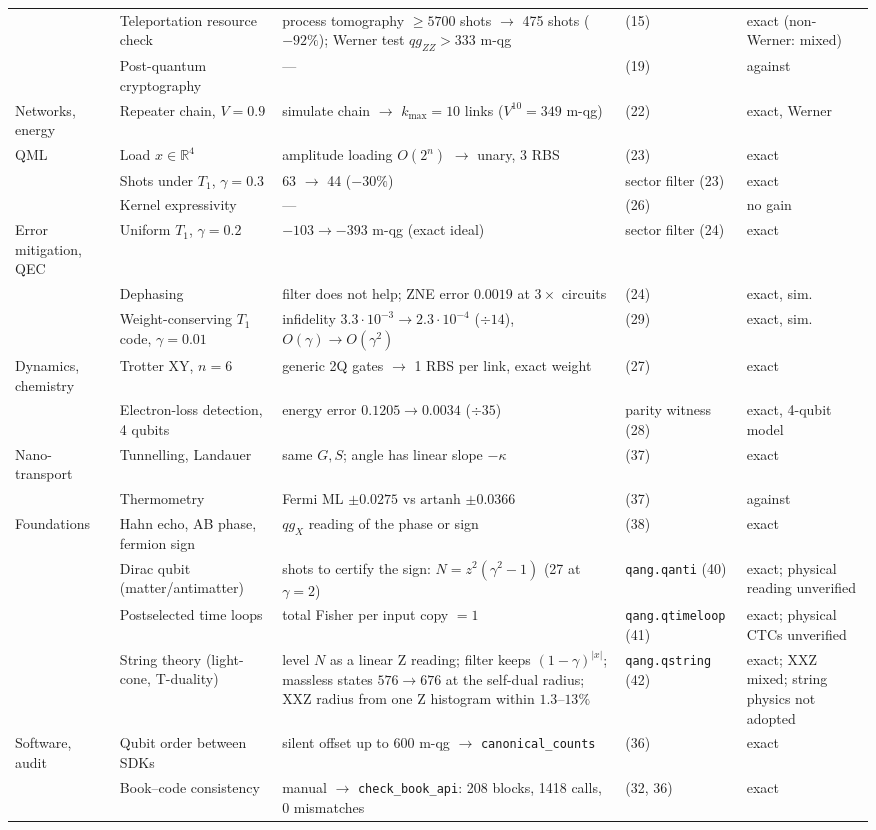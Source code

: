 \documentclass[11pt]{article}
\newcommand{\st}[1]{\texttt{#1}}
\begin{document}
\begin{longtable}{@{}L{2.0cm}L{3.6cm}L{4.9cm}L{3.3cm}L{1.9cm}@{}}
 & Teleportation resource check & process tomography $\ge5700$ shots $\to$ 475 shots ($-92\%$); Werner test $qg_{ZZ}>333$ m-qg & (15) & exact (non-Werner: mixed)\\
 & Post-quantum cryptography & --- & (19) & against\\
Networks, energy & Repeater chain, $V=0.9$ & simulate chain $\to$ $k_{\max}=10$ links ($V^{10}=349$ m-qg) & (22) & exact, Werner\\
QML & Load $x\in\mathbb R^4$ & amplitude loading $O(2^n)$ $\to$ unary, 3 RBS & (23) & exact\\
 & Shots under $T_1$, $\gamma=0.3$ & 63 $\to$ 44 ($-30\%$) & sector filter (23) & exact\\
 & Kernel expressivity & --- & (26) & no gain\\
Error mitigation, QEC & Uniform $T_1$, $\gamma=0.2$ & $-103\to-393$ m-qg (exact ideal) & sector filter (24) & exact\\
 & Dephasing & filter does not help; ZNE error $0.0019$ at $3\times$ circuits & (24) & exact, sim.\\
 & Weight-conserving $T_1$ code, $\gamma=0.01$ & infidelity $3.3\cdot10^{-3}\to2.3\cdot10^{-4}$ ($\div14$), $O(\gamma)\to O(\gamma^2)$ & (29) & exact, sim.\\
Dynamics, chemistry & Trotter XY, $n=6$ & generic 2Q gates $\to$ 1 RBS per link, exact weight & (27) & exact\\
 & Electron-loss detection, 4 qubits & energy error $0.1205\to0.0034$ ($\div35$) & parity witness (28) & exact, 4-qubit model\\
Nano-transport & Tunnelling, Landauer & same $G,S$; angle has linear slope $-\kappa$ & (37) & exact\\
 & Thermometry & Fermi ML $\pm0.0275$ vs $\mathrm{artanh}$ $\pm0.0366$ & (37) & against\\
Foundations & Hahn echo, AB phase, fermion sign & $qg_X$ reading of the phase or sign & (38) & exact\\
 & Dirac qubit (matter/antimatter) & shots to certify the sign: $N=z^2(\gamma^2-1)$ (27 at $\gamma=2$) & \st{qang.qanti} (40) & exact; physical reading unverified\\
 & Postselected time loops & total Fisher per input copy $=1$ & \st{qang.qtimeloop} (41) & exact; physical CTCs unverified\\
 & String theory (light-cone, T-duality) & level $N$ as a linear Z reading; filter keeps $(1-\gamma)^{|x|}$; massless states $576\to676$ at the self-dual radius; XXZ radius from one Z histogram within $1.3$--$13\%$ & \st{qang.qstring} (42) & exact; XXZ mixed; string physics not adopted\\
Software, audit & Qubit order between SDKs & silent offset up to 600 m-qg $\to$ \st{canonical\_counts} & (36) & exact\\
 & Book--code consistency & manual $\to$ \st{check\_book\_api}: 208 blocks, 1418 calls, 0 mismatches & (32, 36) & exact\\
\bottomrule\end{longtable}
\end{document}

